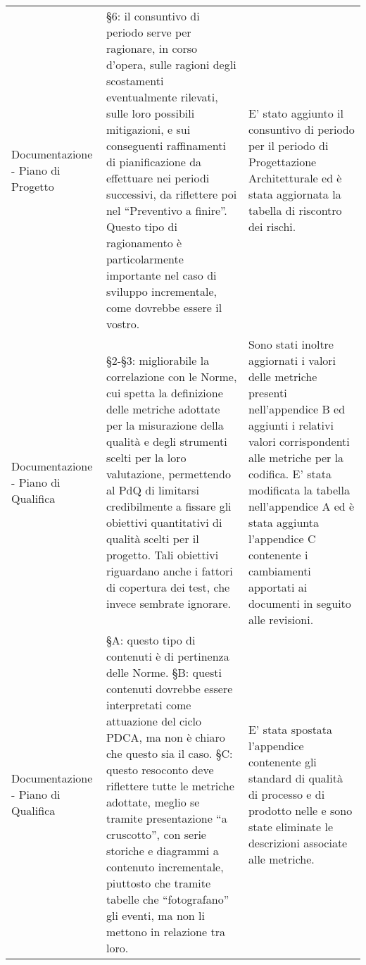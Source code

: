 \begin{longtable}{ 
				>{\centering}p{} 
				>{\centering}p{}
				>{\centering\arraybackslash}p{}}
				Documentazione - Piano di Progetto
					&
				 §6: il consuntivo di periodo serve per ragionare, in corso d'opera, sulle ragioni degli scostamenti eventualmente rilevati, sulle loro possibili mitigazioni, e sui conseguenti raffinamenti di pianificazione da  effettuare nei periodi successivi, da riflettere poi nel “Preventivo a finire”. Questo tipo di ragionamento è particolarmente importante nel caso di sviluppo incrementale, come dovrebbe essere il vostro.
					&
				E' stato aggiunto il consuntivo di periodo per il periodo di Progettazione Architetturale ed è stata aggiornata la tabella di riscontro dei rischi.
					\\
		 
				 Documentazione - Piano di Qualifica
					&
				§2-§3: migliorabile la correlazione con le Norme, cui spetta la definizione delle metriche adottate per la misurazione della qualità e degli strumenti scelti per la loro valutazione, permettendo al PdQ di limitarsi credibilmente a fissare gli obiettivi quantitativi di qualità scelti per il progetto. Tali obiettivi riguardano anche i fattori di copertura dei test, che invece sembrate ignorare.
					&
				Sono stati inoltre aggiornati i valori delle metriche presenti nell'appendice B ed aggiunti i relativi valori corrispondenti alle metriche per la codifica. E' stata modificata la tabella nell'appendice A ed è stata aggiunta l'appendice C contenente i cambiamenti apportati ai documenti in seguito alle revisioni.
					\\
			
				Documentazione - Piano di Qualifica
					&
				§A: questo tipo di contenuti è di pertinenza delle Norme. §B: questi contenuti dovrebbe essere interpretati come attuazione del ciclo PDCA, ma non è chiaro che questo sia il caso. §C: questo resoconto deve riflettere tutte le metriche adottate, meglio se tramite presentazione “a cruscotto”, con serie storiche e diagrammi a contenuto incrementale, piuttosto che tramite tabelle che “fotografano” gli eventi, ma non li mettono in relazione tra loro.
					&
				E' stata spostata l'appendice contenente gli standard di qualità di processo e di prodotto nelle \NdP{} e sono state eliminate le descrizioni associate alle metriche.
					\\

			\end{longtable}
		
